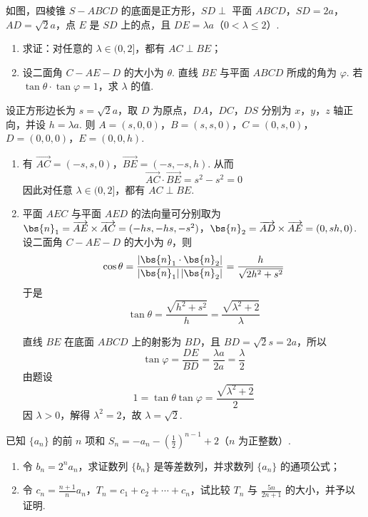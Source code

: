 \begin{problem}
如图，四棱锥 \(S-ABCD\) 的底面是正方形，\(SD \perp\) 平面 \(ABCD\)，\(SD = 2a\)，\(AD = \sqrt{2}a\)，点 \(E\) 是 \(SD\) 上的点，且 \(DE = \lambda a\)（\(0 < \lambda \leqslant 2\)）.

\begin{enumerate}
\item 求证：对任意的 \(\lambda \in (0,2]\)，都有 \(AC \perp BE\)；
\item 设二面角 \(C-AE-D\) 的大小为 \(\theta\). 直线 \(BE\) 与平面 \(ABCD\) 所成的角为 \(\varphi\). 若 \(\tan \theta \cdot \tan \varphi = 1\)，求 \(\lambda\) 的值.
\end{enumerate}

\end{problem}

\begin{solution}
设正方形边长为 \(s=\sqrt{2}a\)，取 \(D\) 为原点，\(DA\)，\(DC\)，\(DS\) 分别为 \(x\)，\(y\)，\(z\) 轴正向，并设 \(h=\lambda a\). 则 \(A=(s,0,0)\)，\(B=(s,s,0)\)，\(C=(0,s,0)\)，\(D=(0,0,0)\)，\(E=(0,0,h)\).

\begin{enumerate}
\item
有 \(\overrightarrow{AC}=(-s,s,0)\)，\(\overrightarrow{BE}=(-s,-s,h)\).
从而
\[
\overrightarrow{AC}\cdot\overrightarrow{BE}=s^{2}-s^{2}=0
\]
因此对任意 \(\lambda\in(0,2]\)，都有 \(AC\perp BE\).

\item 平面 \(AEC\) 与平面 \(AED\) 的法向量可分别取为 \(\bs{n}_{1}=\overrightarrow{AE}\times\overrightarrow{AC}=(-hs,-hs,-s^{2})\)，\(\bs{n}_{2}=\overrightarrow{AD}\times\overrightarrow{AE}=(0,sh,0)\).
设二面角 \(C-AE-D\) 的大小为 \(\theta\)，则
\[
\cos\theta=\frac{|\bs{n}_{1}\cdot\bs{n}_{2}|}{|\bs{n}_{1}|\,|\bs{n}_{2}|}
=\frac{h}{\sqrt{2h^{2}+s^{2}}}
\]
于是
\[
\tan\theta=\frac{\sqrt{h^{2}+s^{2}}}{h}=\frac{\sqrt{\lambda^{2}+2}}{\lambda}
\]

直线 \(BE\) 在底面 \(ABCD\) 上的射影为 \(BD\)，且 \(BD=\sqrt{2}s=2a\)，所以
\[
\tan\varphi=\frac{DE}{BD}=\frac{\lambda a}{2a}=\frac{\lambda}{2}
\]
由题设
\[
1=\tan\theta\tan\varphi=\frac{\sqrt{\lambda^{2}+2}}{2}
\]
因 \(\lambda>0\)，解得 \(\lambda^{2}=2\)，故 \(\lambda=\sqrt{2}\).
\end{enumerate}
\end{solution}

\begin{problem}
已知 \(\{a_{n}\}\) 的前 \(n\) 项和 \(S_{n} = -a_{n} - \left(\frac{1}{2}\right)^{n-1} + 2\)（\(n\) 为正整数）.

\begin{enumerate}
\item 令 \(b_{n} = 2^{n}a_{n}\)，求证数列 \(\{b_{n}\}\) 是等差数列，并求数列 \(\{a_{n}\}\) 的通项公式；
\item 令 \(c_{n} = \frac{n + 1}{n} a_{n}\)，\(T_{n} = c_{1} + c_{2} + \cdots + c_{n}\)，试比较 \(T_{n}\) 与 \(\frac{5n}{2n + 1}\) 的大小，并予以证明.
\end{enumerate}
\end{problem}

